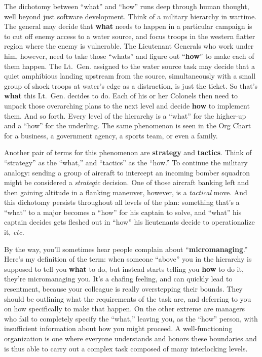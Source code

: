 The dichotomy between ``what'' and ``how'' runs deep through human thought,
well beyond just software development. Think of a military hierarchy in
wartime. The general may decide that \textbf{what} needs to happen in a
particular campaign is to cut off enemy access to a water source, and focus
troops in the western flatter region where the enemy is vulnerable. The
Lieutenant Generals who work under him, however, need to take those ``whats''
and figure out ``\textbf{how}'' to make each of them happen. The Lt.~Gen.
assigned to the water source task may decide that a quiet amphibious landing
upstream from the source, simultaneously with a small group of shock troops at
water's edge as a distraction, is just the ticket. So that's \textbf{what}
this Lt.~Gen. decides to do. Each of his or her Colonels then need to unpack
those overarching plans to the next level and decide \textbf{how} to implement
them. And so forth. Every level of the hierarchy is a ``what'' for the
higher-up and a ``how'' for the underling. The same phenomenon is seen in the
Org Chart for a business, a government agency, a sports team, or even a
family.

Another pair of terms for this phenomenon are \textbf{strategy} and
\textbf{tactics}. Think of ``strategy'' as the ``what,'' and ``tactics'' as
the ``how.'' To continue the military analogy: sending a group of aircraft to
intercept an incoming bomber squadron might be considered a \textit{strategic}
decision. One of those aircraft banking left and then gaining altitude in a
flanking maneuver, however, is a \textit{tactical} move. And this dichotomy
persists throughout all levels of the plan: something that's a ``what'' to a
major becomes a ``how'' for his captain to solve, and ``what'' his captain
decides gets fleshed out in ``how'' his lieutenants decide to operationalize
it, \textit{etc.}

By the way, you'll sometimes hear people complain about
``\textbf{micromanaging}.'' Here's my definition of the term: when someone
``above'' you in the hierarchy is supposed to tell you \textbf{what} to do,
but instead starts telling you \textbf{how} to do it, they're micromanaging
you. It's a chafing feeling, and can quickly lead to resentment, because your
colleague is really overstepping their bounds. They should be outlining what
the requirements of the task are, and deferring to you on how specifically to
make that happen. On the other extreme are managers who fail to completely
specify the ``what,'' leaving you, as the ``how'' person, with insufficient
information about how you might proceed. A well-functioning organization is
one where everyone understands and honors these boundaries and is thus able to
carry out a complex task composed of many interlocking levels.


